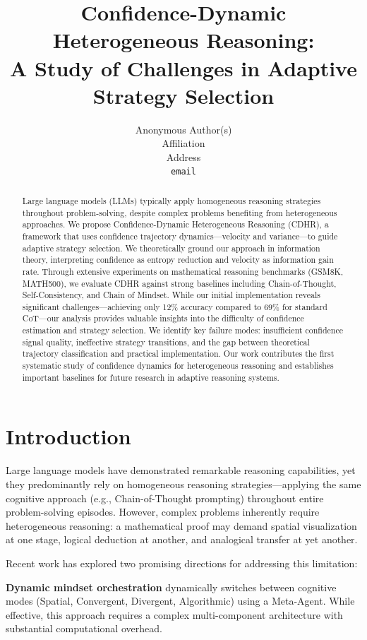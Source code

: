 \documentclass{article}
\title{Confidence-Dynamic Heterogeneous Reasoning: \protect\\ A Study of Challenges in Adaptive Strategy Selection}
\author{%
  Anonymous Author(s) \\
  Affiliation \\
  Address \\
  \texttt{email} \\
}
\begin{document}
\maketitle

\begin{abstract}
Large language models (LLMs) typically apply homogeneous reasoning strategies throughout problem-solving, despite complex problems benefiting from heterogeneous approaches. We propose Confidence-Dynamic Heterogeneous Reasoning (CDHR), a framework that uses confidence trajectory dynamics---velocity and variance---to guide adaptive strategy selection. We theoretically ground our approach in information theory, interpreting confidence as entropy reduction and velocity as information gain rate. Through extensive experiments on mathematical reasoning benchmarks (GSM8K, MATH500), we evaluate CDHR against strong baselines including Chain-of-Thought, Self-Consistency, and Chain of Mindset. While our initial implementation reveals significant challenges---achieving only 12\% accuracy compared to 69\% for standard CoT---our analysis provides valuable insights into the difficulty of confidence estimation and strategy selection. We identify key failure modes: insufficient confidence signal quality, ineffective strategy transitions, and the gap between theoretical trajectory classification and practical implementation. Our work contributes the first systematic study of confidence dynamics for heterogeneous reasoning and establishes important baselines for future research in adaptive reasoning systems.
\end{abstract}

\section{Introduction}

Large language models have demonstrated remarkable reasoning capabilities, yet they predominantly rely on homogeneous reasoning strategies---applying the same cognitive approach (e.g., Chain-of-Thought prompting) throughout entire problem-solving episodes. However, complex problems inherently require heterogeneous reasoning: a mathematical proof may demand spatial visualization at one stage, logical deduction at another, and analogical transfer at yet another.

Recent work has explored two promising directions for addressing this limitation:

\textbf{Dynamic mindset orchestration} \citep{jiang2024chain} dynamically switches between cognitive modes (Spatial, Convergent, Divergent, Algorithmic) using a Meta-Agent. While effective, this approach requires a complex multi-component architecture with substantial computational overhead.
\end{document}
